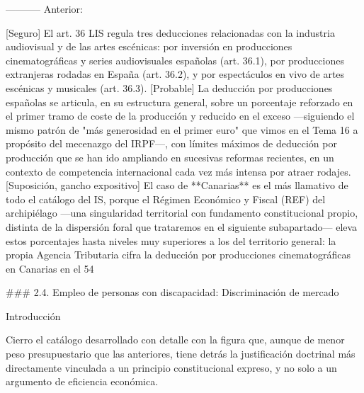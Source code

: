 \documentclass[10pt,a4paper]{article}
\begin{document}
----------- Anterior:

[Seguro] El art. 36 LIS regula tres deducciones relacionadas con la industria audiovisual y de las artes escénicas: por inversión en producciones cinematográficas y series audiovisuales españolas (art. 36.1), por producciones extranjeras rodadas en España (art. 36.2), y por espectáculos en vivo de artes escénicas y musicales (art. 36.3). [Probable] La deducción por producciones españolas se articula, en su estructura general, sobre un porcentaje reforzado en el primer tramo de coste de la producción y reducido en el exceso —siguiendo el mismo patrón de "más generosidad en el primer euro" que vimos en el Tema 16 a propósito del mecenazgo del IRPF—, con límites máximos de deducción por producción que se han ido ampliando en sucesivas reformas recientes, en un contexto de competencia internacional cada vez más intensa por atraer rodajes. [Suposición, gancho expositivo] El caso de **Canarias** es el más llamativo de todo el catálogo del IS, porque el Régimen Económico y Fiscal (REF) del archipiélago —una singularidad territorial con fundamento constitucional propio, distinta de la dispersión foral que trataremos en el siguiente subapartado— eleva estos porcentajes hasta niveles muy superiores a los del territorio general: la propia Agencia Tributaria cifra la deducción por producciones cinematográficas en Canarias en el 54%

### 2.4. Empleo de personas con discapacidad: Discriminación de mercado

Introducción

Cierro el catálogo desarrollado con detalle con la figura que, aunque de menor peso presupuestario que las anteriores, tiene detrás la justificación doctrinal más directamente vinculada a un principio constitucional expreso, y no solo a un argumento de eficiencia económica.
\end{document}
